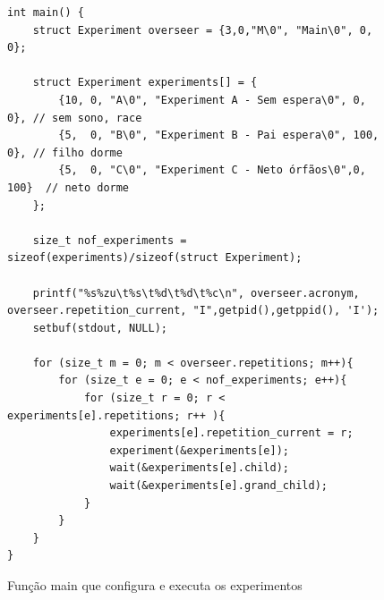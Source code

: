\documentclass[12pt]{article}
\begin{document}
\begin{figure}[ht]
\begin{verbatim}
int main() {
    struct Experiment overseer = {3,0,"M\0", "Main\0", 0, 0};

    struct Experiment experiments[] = {
        {10, 0, "A\0", "Experiment A - Sem espera\0", 0, 0}, // sem sono, race
        {5,  0, "B\0", "Experiment B - Pai espera\0", 100, 0}, // filho dorme
        {5,  0, "C\0", "Experiment C - Neto órfãos\0",0, 100}  // neto dorme
    };

    size_t nof_experiments = sizeof(experiments)/sizeof(struct Experiment);

    printf("%s%zu\t%s\t%d\t%d\t%c\n", overseer.acronym, overseer.repetition_current, "I",getpid(),getppid(), 'I');
    setbuf(stdout, NULL);

    for (size_t m = 0; m < overseer.repetitions; m++){
        for (size_t e = 0; e < nof_experiments; e++){
            for (size_t r = 0; r < experiments[e].repetitions; r++ ){
                experiments[e].repetition_current = r;
                experiment(&experiments[e]);
                wait(&experiments[e].child);
                wait(&experiments[e].grand_child);
            }
        }
    }
}
\end{verbatim}
\caption{Função main que configura e executa os experimentos}
\label{fig:code3}
\end{figure}
\end{document}
